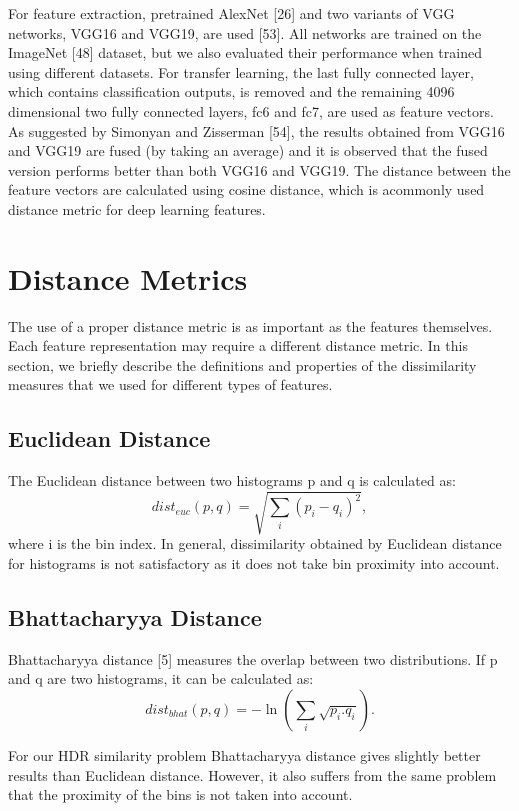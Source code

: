 For feature extraction, pretrained AlexNet [26] and two variants of VGG networks, VGG16 and VGG19, are
used [53]. All networks are trained on the ImageNet [48] dataset, but we also evaluated their performance when
trained using different datasets. For transfer learning, the last fully connected layer, which contains classification outputs, is removed and the remaining 4096 dimensional two fully connected layers, fc6 and fc7, are used as feature vectors. As suggested by Simonyan and Zisserman [54], the results obtained from VGG16 and VGG19 are fused (by taking an average) and it is observed that the fused version performs better than both VGG16 and VGG19. The distance between the feature vectors are calculated using cosine distance, which is acommonly used distance metric for deep learning features.
\section{Distance Metrics}
The use of a proper distance metric is as important as the features themselves. Each feature representation
may require a different distance metric. In this section, we briefly describe the definitions and properties of the dissimilarity measures that we used for different types of features.
\subsection{Euclidean Distance}
The Euclidean distance between two histograms p and q is calculated as:
\begin{equation}
dist_{euc}(p,q) = \sqrt{\sum_i(p_i-q_i)^2},
\end{equation}
where i is the bin index. In general, dissimilarity obtained by Euclidean distance for histograms is not satisfactory as it does not take bin proximity into account.
\subsection{Bhattacharyya Distance}
Bhattacharyya distance [5] measures the overlap between two distributions. If p and q are two histograms, it can be calculated as:
\begin{equation}
dist_{bhat}(p,q) = -\ln \left( \sum_i \sqrt{p_i.q_i} \right).
\end{equation}

For our HDR similarity problem Bhattacharyya distance gives slightly better results than Euclidean distance. However, it also suffers from the same problem that the proximity of the bins is not taken into account.
